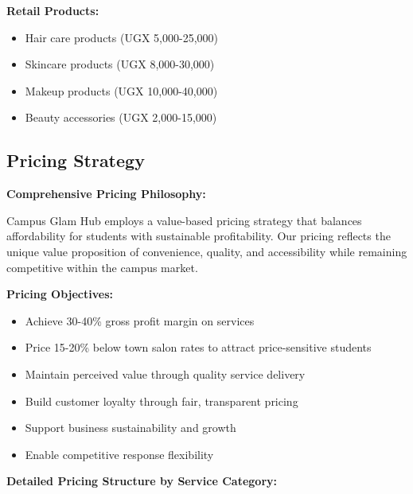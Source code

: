 \documentclass[a4paper,12pt]{article}
\begin{document}
\textbf{Retail Products:}
\begin{itemize}[leftmargin=2em]
    \item Hair care products (UGX 5,000-25,000)
    \item Skincare products (UGX 8,000-30,000)
    \item Makeup products (UGX 10,000-40,000)
    \item Beauty accessories (UGX 2,000-15,000)
\end{itemize}

\subsection{Pricing Strategy}

\textbf{Comprehensive Pricing Philosophy:}

Campus Glam Hub employs a value-based pricing strategy that balances affordability for students with sustainable profitability. Our pricing reflects the unique value proposition of convenience, quality, and accessibility while remaining competitive within the campus market.

\textbf{Pricing Objectives:}
\begin{itemize}[leftmargin=2em]
    \item Achieve 30-40\% gross profit margin on services
    \item Price 15-20\% below town salon rates to attract price-sensitive students
    \item Maintain perceived value through quality service delivery
    \item Build customer loyalty through fair, transparent pricing
    \item Support business sustainability and growth
    \item Enable competitive response flexibility
\end{itemize}

\vspace{1em}

\textbf{Detailed Pricing Structure by Service Category:}
\end{document}
